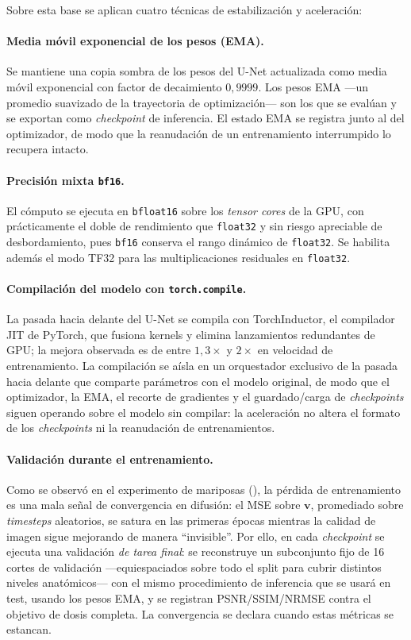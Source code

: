 Sobre esta base se aplican cuatro técnicas de estabilización y
aceleración:

\paragraph{Media móvil exponencial de los pesos (EMA).}
Se mantiene una copia sombra de los pesos del U-Net actualizada como
media móvil exponencial con factor de decaimiento $0{,}9999$. Los
pesos EMA —un promedio suavizado de la trayectoria de optimización—
son los que se evalúan y se exportan como \textit{checkpoint} de
inferencia. El estado EMA se registra junto al del
optimizador, de modo que la reanudación de un entrenamiento
interrumpido lo recupera intacto.

\paragraph{Precisión mixta \texttt{bf16}.}
El cómputo se ejecuta en \texttt{bfloat16} sobre los \textit{tensor
cores} de la GPU, con prácticamente el doble de rendimiento que
\texttt{float32} y sin riesgo apreciable de desbordamiento, pues
\texttt{bf16} conserva el rango dinámico de \texttt{float32}. Se habilita
además el modo TF32 para las multiplicaciones residuales en
\texttt{float32}.

\paragraph{Compilación del modelo con \texttt{torch.compile}.}
La pasada hacia delante del U-Net se compila con TorchInductor, el
compilador JIT de PyTorch, que fusiona kernels y elimina
lanzamientos redundantes de GPU; la mejora observada es de entre $1{,}3\times$ y
$2\times$ en velocidad de entrenamiento. La compilación se aísla en
un orquestador exclusivo de la pasada hacia delante que comparte
parámetros con el modelo original, de modo que el optimizador, la
EMA, el recorte de gradientes y el guardado/carga de
\textit{checkpoints} siguen operando sobre el modelo sin compilar:
la aceleración no altera el formato de los \textit{checkpoints} ni
la reanudación de entrenamientos.

\paragraph{Validación durante el entrenamiento.}
Como se observó en el experimento de mariposas
(), la pérdida de entrenamiento es
una mala señal de convergencia en difusión: el MSE sobre
$\mathbf{v}$, promediado sobre \textit{timesteps} aleatorios, se
satura en las primeras épocas mientras la calidad de imagen sigue
mejorando de manera ``invisible''. Por ello, en cada \textit{checkpoint} se ejecuta una
validación \emph{de tarea final}: se reconstruye un subconjunto fijo
de 16 cortes de validación —equiespaciados sobre todo el split para
cubrir distintos niveles anatómicos— con el mismo procedimiento de
inferencia que se usará en test, usando los pesos EMA, y se
registran PSNR/SSIM/NRMSE contra el objetivo de dosis completa. La
convergencia se declara cuando estas métricas se estancan.


